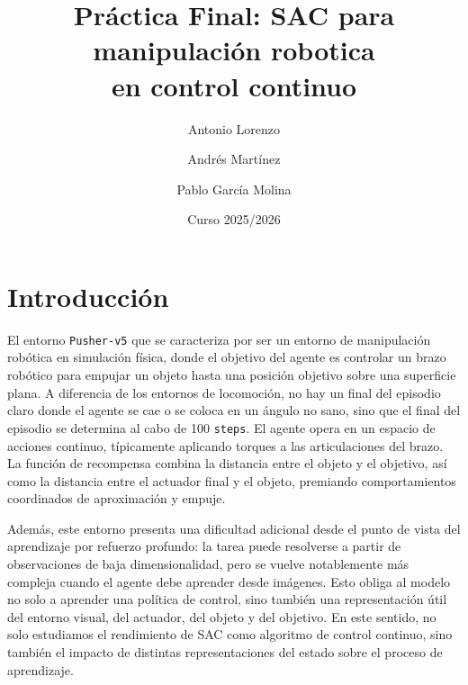 \documentclass[10pt,twocolumn]{article}
\title{\textbf{Práctica Final: SAC para manipulación robotica\\
en control continuo}}
\author{Antonio Lorenzo \and Andrés Martínez \and Pablo García Molina}
\date{Curso 2025/2026}
\begin{document}

\section{Introducción}

El entorno \texttt{Pusher-v5} que se caracteriza por ser un entorno de manipulación robótica en simulación física, donde el objetivo del agente es controlar un brazo robótico para empujar un objeto hasta una posición objetivo sobre una superficie plana. A diferencia de los entornos de locomoción, no hay un final del episodio claro donde el agente se cae o se coloca en un ángulo no sano, sino que el final del episodio se determina al cabo de 100 \texttt{steps}. El agente opera en un espacio de acciones continuo, típicamente aplicando torques a las articulaciones del brazo. La función de recompensa combina la distancia entre el objeto y el objetivo, así como la distancia entre el actuador final y el objeto, premiando comportamientos coordinados de aproximación y empuje.

Además, este entorno presenta una dificultad adicional desde el punto de vista del aprendizaje por refuerzo profundo: la tarea puede resolverse a partir de observaciones de baja dimensionalidad, pero se vuelve notablemente más compleja cuando el agente debe aprender desde imágenes. Esto obliga al modelo no solo a aprender una política de control, sino también una representación útil del entorno visual, del actuador, del objeto y del objetivo. En este sentido, no solo estudiamos el rendimiento de SAC como algoritmo de control continuo, sino también el impacto de distintas representaciones del estado sobre el proceso de aprendizaje.
\end{document}
